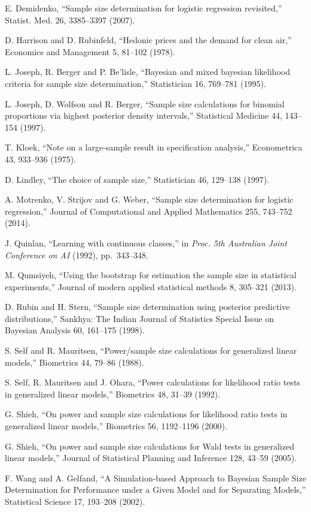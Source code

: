\documentclass[
11pt,%
tightenlines,%
twoside,%
onecolumn,%
nofloats,%
nobibnotes,%
nofootinbib,%
superscriptaddress,%
noshowpacs,%
centertags]%
{revtex4}
\begin{document}
\begin{thebibliography}{}
	E. Demidenko, ``Sample size determination for logistic regression revisited,'' Statist. Med. 26, 3385--3397 (2007).
	
	D. Harrison and D. Rubinfeld, ``Hedonic prices and the demand for clean air,'' Economics and Management 5, 81--102 (1978).
	
	L. Joseph, R. Berger and P. Be'lisle, ``Bayesian and mixed bayesian likelihood criteria for sample size determination,'' Statistician 16, 769--781 (1995).
	
	L. Joseph, D. Wolfson and R. Berger, ``Sample size calculations for binomial proportions via highest posterior density intervals,'' Statistical Medicine 44, 143--154 (1997).
	
	T. Kloek, ``Note on a large-sample result in specification analysis,'' Econometrica 43, 933--936  (1975).
	
	D. Lindley, ``The choice of sample size,'' Statistician 46, 129--138 (1997).
	
	A. Motrenko, V. Strijov and G. Weber, ``Sample size determination for logistic regression,'' Journal of Computational and Applied Mathematics 255, 743--752 (2014).
	
	J. Quinlan, ``Learning with continuous classes,'' in \textit{Proc. 5th Australian Joint Conference on AI} (1992), pp.~343--348.
	
	M. Qumsiyeh, ``Using the bootstrap for estimation the sample size in statistical experiments,'' Journal of modern applied statistical methods 8, 305--321 (2013).
	
	D. Rubin and H. Stern, ``Sample size determination using posterior predictive distributions,'' Sankhya: The Indian Journal of Statistics Special Issue on Bayesian Analysis 60, 161--175 (1998).
	
	S. Self and R. Mauritsen, ``Power/sample size calculations for generalized linear models,'' Biometrics 44, 79--86 (1988).
	
	S. Self, R. Mauritsen and J. Ohara, ``Power calculations for likelihood ratio tests in generalized linear models,'' Biometrics 48, 31--39 (1992).
	
	G. Shieh, ``On power and sample size calculations for likelihood ratio tests in generalized linear models,'' Biometrics 56, 1192--1196 (2000).
	
	G. Shieh, ``On power and sample size calculations for Wald tests in generalized linear models,'' Journal of Statistical Planning and Inference 128, 43--59 (2005).

	F. Wang and A. Gelfand, ``A Simulation-based Approach to Bayesian Sample Size Determination for Performance under a Given Model and for Separating Models,'' Statistical Science 17, 193--208 (2002).

\end{thebibliography}
\end{document}
